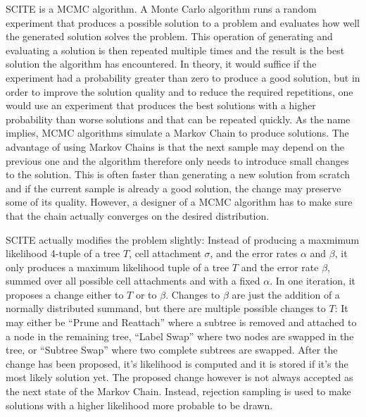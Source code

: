 \ac{SCITE} is a \ac{MCMC} algorithm. A Monte Carlo algorithm runs a random experiment that produces a possible solution to a problem and evaluates how well the generated solution solves the problem. This operation of generating and evaluating a solution is then repeated multiple times and the result is the best solution the algorithm has encountered. In theory, it would suffice if the experiment had a probability greater than zero to produce a good solution, but in order to improve the solution quality and to reduce the required repetitions, one would use an experiment that produces the best solutions with a higher probability than worse solutions and that can be repeated quickly. As the name implies, \ac{MCMC} algorithms simulate a Markov Chain to produce solutions. The advantage of using Markov Chains is that the next sample may depend on the previous one and the algorithm therefore only needs to introduce small changes to the solution. This is often faster than generating a new solution from scratch and if the current sample is already a good solution, the change may preserve some of its quality. However, a designer of a \ac{MCMC} algorithm has to make sure that the chain actually converges on the desired distribution.

\ac{SCITE} actually modifies the problem slightly: Instead of producing a maxmimum likelihood 4-tuple of a tree $T$, cell attachment $\sigma$, and the error rates $\alpha$ and $\beta$, it only produces a maximum likelihood tuple of a tree $T$ and the error rate $\beta$, summed over all possible cell attachments and with a fixed $\alpha$. In one iteration, it proposes a change either to $T$ or to $\beta$. Changes to $\beta$ are just the addition of a normally distributed summand, but there are multiple possible changes to $T$: It may either be ``Prune and Reattach'' where a subtree is removed and attached to a node in the remaining tree, ``Label Swap'' where two nodes are swapped in the tree, or ``Subtree Swap'' where two complete subtrees are swapped. After the change has been proposed, it's likelihood is computed and it is stored if it's the most likely solution yet. The proposed change however is not always accepted as the next state of the Markov Chain. Instead, rejection sampling is used to make solutions with a higher likelihood more probable to be drawn.

